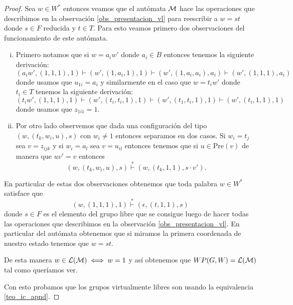 \documentclass[tesis.tex]{subfiles}
\begin{document}
\begin{proof}
	Sea $w \in W^*$ entonces veamos que el autómata $\cal M$ hace las operaciones que describimos en la observación \ref{obs_presentacion_vl} para reescribir a $w = st$ donde $s \in F$ reducida y $t \in T$.
	Para esto veamos primero dos observaciones del funcionamiento de este autómata.
	
	\begin{enumerate}[i)]
		\item Primero notamos que si $w = a_{i}w'$ donde $a_{i} \in B$ entonces tenemos la siguiente derivación:
		\[
		(a_{i}w', ( 1,1,1), 1 ) \vdash (w', (1,a_{i},1),1) \vdash (w',(1,a_{i},a_{i}),a_{i}) \vdash (w', (1,1,1), a_{i})
		\]
		donde usamos que $u_{1i} = a_{i}$
		y similarmente en el caso que $w = t_{i}w'$ donde $t_{i} \in T$ tenemos la siguiente derivación:
		\[
		(t_{i}w', (1,1,1), 1) \vdash (w', (t_{i},t_{i},1),1) \vdash (w',(t_{1},t_{i},1),1) \vdash (w', (t_{i},1,1), 1)
		\]
		donde usamos que $z_{1i1} = 1$.
		
		\item Por otro lado observemos que dada una configuración del tipo $(w, ( t_{k}, w_{i}, u), s)$ con $w_{i} \neq 1$ entonces separamos en dos casos.
		Si $w_{i} = t_{j}$ sea $v = z_{ijk}$ y si $w_{i} = a_{l}$ sea $v = u_{il}$ entonces tenemos que si $u \in \text{Pre}(v)$ de manera que $uv' = v$ entonces
		\[
		(w, ( t_{k}, w_{i}, u), s) \overset{*}{\vdash} (w, ( t_{k}, 1, 1), s \cdot v').
		\]
	\end{enumerate}
	
	
	
	
	
	
	En particular de estas dos observaciones obtenemos que toda palabra $w \in W^*$ satisface que 
	\[
		(w, (1,1,1), 1) \overset{*}{\vdash} (\epsilon, (t, 1,1), s)
	\]
	donde $s \in F$ es el elemento del grupo libre que se consigue luego de hacer todas las operaciones que describimos en la observación \ref{obs_presentacion_vl}. 
	En particular del autómata obtenemos que si miramos la primera coordenada de nuestro estado tenemos que $w = st$.
	
	De esta manera $w \in {\cal L(M)} \iff w = 1 $ y así obtenemos que $WP(G,W) = \cal L(M)$ tal como queríamos ver.
	
	
	
	Con esto probamos que los grupos virtualmente libres son \ic usando la equivalencia \ref{teo_ic_apnd}.
	
\end{proof}

\begin{center}
\end{center}
\end{document}
